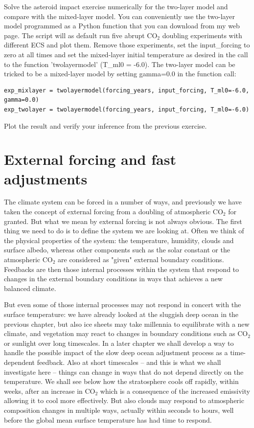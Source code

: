 \documentclass[12pt]{book}
\begin{document}
{\begin{exercise}
Solve the asteroid impact exercise numerically for the two-layer model and compare with the mixed-layer model. You can conveniently use the two-layer model programmed as a Python function that you can download from my web page. The script will as default run five abrupt CO$_2$ doubling experiments with different ECS and plot them. Remove those experiments, set the input\_forcing to zero at all times and set the mixed-layer initial temperature as desired in the call to the function 'twolayermodel' (T\_ml0 = -6.0). The two-layer model can be tricked to be a mixed-layer model by setting gamma=0.0 in the function call: 
\begin{verbatim}
exp_mixlayer = twolayermodel(forcing_years, input_forcing, T_ml0=-6.0, gamma=0.0)
exp_twolayer = twolayermodel(forcing_years, input_forcing, T_ml0=-6.0)
\end{verbatim}
Plot the result and verify your inference from the previous exercise.
\end{exercise}

}

\chapter{External forcing and fast adjustments}
\label{chapter:forcing}
The climate system can be forced in a number of ways, and previously we have taken the concept of external forcing from a doubling of atmospheric CO$_2$ for granted. But what we mean by external forcing is not always obvious. The first thing we need to do is to define the system we are looking at. Often we think of the physical properties of the system: the temperature, humidity, clouds and surface albedo, whereas other components such as the solar constant or the atmospheric CO$_2$ are considered as "given" external boundary conditions. Feedbacks are then those internal processes within the system that respond to changes in the external boundary conditions in ways that achieves a new balanced climate. 

But even some of those internal processes may not respond in concert with the surface temperature: we have already looked at the sluggish deep ocean in the previous chapter, but also ice sheets may take millennia to equilibrate with a new climate, and vegetation may react to changes in boundary conditions such as CO$_2$ or sunlight over long timescales. In a later chapter we shall develop a way to handle the possible impact of the slow deep ocean adjustment process as a time-dependent feedback. 
Also at short timescales -- and this is what we shall investigate here -- things can change in ways that do not depend directly on the temperature. We shall see below how the stratosphere cools off rapidly, within weeks, after an increase in CO$_2$ which is a consequence of the increased emissivity allowing it to cool more effectively. But also clouds may respond to atmospheric composition changes in multiple ways, actually within seconds to hours, well before the global mean surface temperature has had time to respond.
\end{document}
